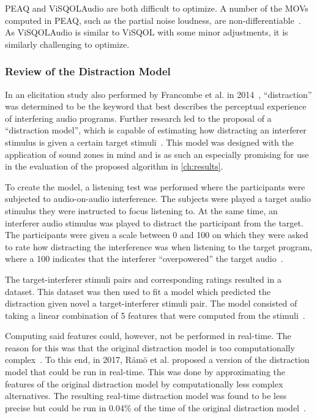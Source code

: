 PEAQ and ViSQOLAudio are both difficult to optimize.
A number of the MOVs computed in PEAQ, such as the partial noise loudness, are non-differentiable~\cite{thiede2000peaq}.
As ViSQOLAudio is similar to ViSQOL with some minor adjustments, it is similarly challenging to optimize.

\subsubsection{Review of the Distraction Model}
In an elicitation study also performed by Francombe et al. 
in 2014~\cite{francombe2014elicitation}, ``distraction'' was determined to be the keyword that best describes the perceptual experience of interfering audio programs.
Further research led to the proposal of a ``distraction model'', which is capable of estimating how distracting an interferer stimulus is given a certain target stimuli~\cite{francombe2015model}.
This model was designed with the application of sound zones in mind and is as such an especially promising
for use in the evaluation of the proposed algorithm in \autoref{ch:results}.

To create the model, a listening test was performed where the participants were subjected to audio-on-audio interference.
The subjects were played a target audio stimulus they were instructed to focus listening to.
At the same time, an interferer audio stimulus was played to distract the participant from the target.
The participants were given a scale between 0 and 100 on which they were asked to rate how distracting the interference
was when listening to the target program, where a 100 indicates that the interferer ``overpowered'' the target audio~\cite{francombe2015model}.

The target-interferer stimuli pairs and corresponding ratings resulted in a dataset.
This dataset was then used to fit a model which predicted the distraction given novel a target-interferer stimuli pair.
The model consisted of taking a linear combination of 5 features that were computed from the stimuli~\cite{francombe2015model}.

Computing said features could, however, not be performed in real-time.
The reason for this was that the original distraction model is too computationally complex~\cite{ramo2017real}.
To this end, in 2017, R\"am\"o et al. proposed a version of the distraction model that could be run in real-time.
This was done by approximating the features of the original distraction model by computationally less complex alternatives.
The resulting real-time distraction model was found to be less precise but could be run in 0.04\% of the time of the 
original distraction model~\cite{ramo2017real}.


